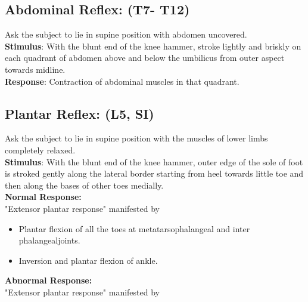\documentclass[a4paper,12pt,openany,oneside]{book}
\begin{document}
\subsection*{Abdominal Reflex: (T7- T12)}
Ask the subject to lie in supine position with abdomen uncovered.\\
\textbf{Stimulus}: With the blunt end of the knee hammer, stroke lightly and briskly on each quadrant of abdomen above and below the umbilicus from outer aspect towards midline.\\
\textbf{Response}: Contraction of abdominal muscles in that quadrant.
\subsection*{Plantar Reflex: (L5, SI)}
Ask the subject to lie in supine position with the muscles of lower limbs completely relaxed.\\
\textbf{Stimulus}: With the blunt end of the knee hammer, outer edge of the sole of foot is stroked gently along the lateral border starting from heel towards little toe and then along the bases of other toes medially.\\
\textbf{Normal Response: }\\
"Extensor plantar response" manifested by
\begin{itemize}
		\itemsep0em
\item{Plantar flexion of all the toes at metatarsophalangeal and inter phalangealjoints.}
\item{Inversion and plantar flexion of ankle.}
\end{itemize}
\textbf{Abnormal Response:}\\
"Extensor plantar response" manifested by
\end{document}
